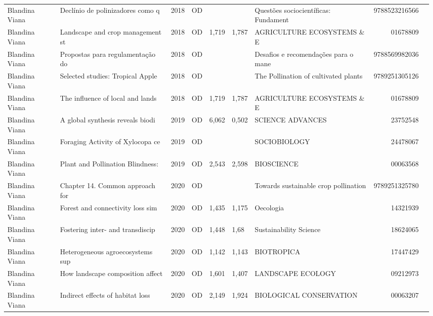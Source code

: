 \documentclass[12pt,brazil]{article}\usepackage[]{graphicx}\usepackage[]{xcolor}
\begin{document}
\begin{longtable}{lllrrllrr}
\rowcolor{coautr}\rowcolor{coautr}\rowcolor{coautr}\rowcolor{coautr}\rowcolor{coautr}\rowcolor{coautr}\rowcolor{coautr}\rowcolor{coautr}\rowcolor{coautr}\rowcolor{coautr}\rowcolor{coautr}\rowcolor{coautr}\rowcolor{coautr}\rowcolor{coautr}\rowcolor{coautr}\rowcolor{coautr}Blandina Viana & Declínio de polinizadores como q & 2018 & OD &  &  & Questões sociocientíficas: Fundament & 9788523216566 \\
Blandina Viana & Landscape and crop management st & 2018 & OD & 1,719 & 1,787 & AGRICULTURE ECOSYSTEMS \& E & 01678809 \\
Blandina Viana & Propostas para regulamentação do & 2018 & OD &  &  & Desafios e recomendações para o mane & 9788569982036 \\
Blandina Viana & Selected studies: Tropical Apple & 2018 & OD &  &  & The Pollination of cultivated plants & 9789251305126 \\
Blandina Viana & The influence of local and lands & 2018 & OD & 1,719 & 1,787 & AGRICULTURE ECOSYSTEMS \& E & 01678809 \\
Blandina Viana & A global synthesis reveals biodi & 2019 & OD & 6,062 & 0,502 & SCIENCE ADVANCES & 23752548 \\
Blandina Viana & Foraging Activity of Xylocopa ce & 2019 & OD &  &  & SOCIOBIOLOGY & 24478067 \\
Blandina Viana & Plant and Pollination Blindness: & 2019 & OD & 2,543 & 2,598 & BIOSCIENCE & 00063568 \\
Blandina Viana & Chapter 14. Common approach for  & 2020 & OD &  &  & Towards sustainable crop pollination & 9789251325780 \\
Blandina Viana & Forest and connectivity loss sim & 2020 & OD & 1,435 & 1,175 & Oecologia & 14321939 \\
\rowcolor{coautr}\rowcolor{coautr}\rowcolor{coautr}\rowcolor{coautr}\rowcolor{coautr}\rowcolor{coautr}\rowcolor{coautr}\rowcolor{coautr}\rowcolor{coautr}\rowcolor{coautr}\rowcolor{coautr}\rowcolor{coautr}\rowcolor{coautr}\rowcolor{coautr}\rowcolor{coautr}\rowcolor{coautr}Blandina Viana & Fostering inter- and transdiscip & 2020 & OD & 1,448 & 1,68 & Sustainability Science & 18624065 \\
Blandina Viana & Heterogeneous agroecosystems sup & 2020 & OD & 1,142 & 1,143 & BIOTROPICA & 17447429 \\
Blandina Viana & How landscape composition affect & 2020 & OD & 1,601 & 1,407 & LANDSCAPE ECOLOGY & 09212973 \\
Blandina Viana & Indirect effects of habitat loss & 2020 & OD & 2,149 & 1,924 & BIOLOGICAL CONSERVATION & 00063207 \\

\end{longtable}
\end{document}
